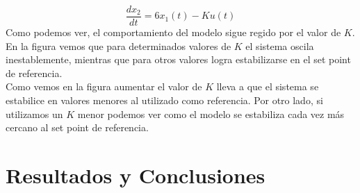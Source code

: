 \documentclass{sig-alternate}
\begin{document}
\begin{equation}
 \label{eq:x_2dot}
 \frac{dx_{2}}{dt} = 6x_1(t) - Ku(t)
\end{equation}
Como podemos ver, el comportamiento del modelo sigue regido por el valor de $K$. En la figura vemos que para determinados valores de $K$ el sistema
oscila inestablemente, mientras que para otros valores logra estabilizarse en el set point de referencia.\\
Como vemos en la figura aumentar el valor de $K$ lleva a que el sistema se estabilice en valores menores al utilizado como referencia. Por otro lado,
si utilizamos un $K$ menor podemos ver como el modelo se estabiliza cada vez más cercano al set point de referencia.

\section{Resultados y Conclusiones}
\label{results_and_conclusions_section}



\nocite{*}

\end{document}
